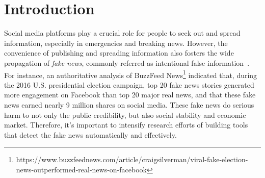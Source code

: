 \documentclass[conference]{IEEEtran}
\newcommand{\kai}[1]{\textcolor{blue}{Kai: {#1}}}
\begin{document}
	\section{Introduction}
	Social media platforms play a crucial role for people to seek out and spread information, especially in emergencies and breaking news. However, the convenience of publishing and spreading information also fosters the wide propagation of \textit{fake news}, commonly referred as intentional false information~\cite{shu2017fake}. %
	For instance,  an authoritative analysis of BuzzFeed News\footnote{https://www.buzzfeednews.com/article/craigsilverman/viral-fake-election-news-outperformed-real-news-on-facebook} indicated that, during the 2016 U.S. presidential election campaign, top 20 fake news stories generated more engagement on Facebook than top 20 major real news, and that these fake news earned nearly 9 million shares on social media. These fake news do serious harm to not only the public credibility, but also social stability and economic market. Therefore, it's important to intensify research efforts of building tools that detect the fake news automatically and effectively. 
	
\end{document}
